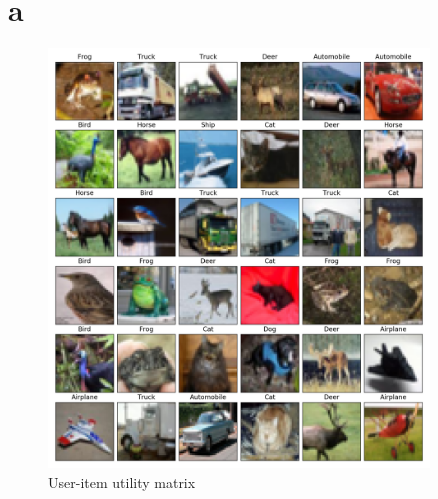 

\usepackage{graphicx, amssymb, amsmath, listings, float, mathtools}
\usepackage{color, url}
\lstset{language = Python}
\lstset{breaklines}
\lstset{extendedchars=false}

\oddsidemargin 0in
\evensidemargin 0in
\textwidth 6.5in
\topmargin -0.6in
\textheight 9.0in





\section{a}

\begin{figure}[htbp]
\centering
\includegraphics[width=0.9\textwidth]{./figures/snapshot.png}
\caption{User-item utility matrix}
\label{fig:utility} 
\end{figure}


\clearpage

%
%
%



